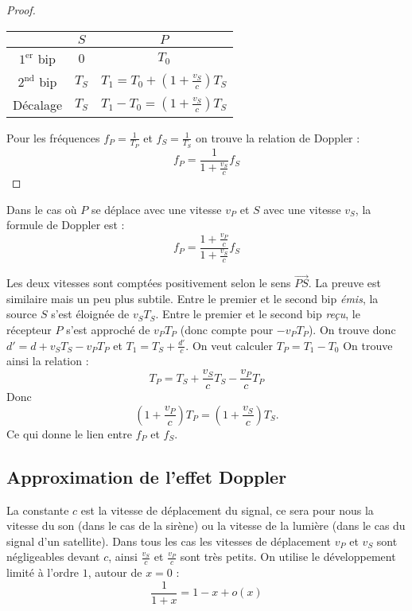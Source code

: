 \documentclass[class=report,crop=false]{standalone}
\newcommand{\vect}{\overrightarrow}
\begin{document}
\begin{proof}
\begin{center}
\setlength{\arrayrulewidth}{0.05mm}
\begin{tabular}[t]{ccc@{\vrule depth 2.5ex height 3.5ex width 0mm \ }} 
  \quad  \qquad         & \quad $S$ \quad     & \quad $P$ \quad          \\ \hline\hline
   $1^{\text{er}}$ bip  & $0$      & $T_0$         \\ \hline
   $2^{\text{nd}}$ bip  & $T_S$    & $T_1=T_0+\left(1+\frac{v_S}{c}\right)T_S$ \\ \hline
   Décalage             & $T_S$    & $T_1-T_0 = \left(1+\frac{v_S}{c}\right)T_S$  \\    
\end{tabular} 
\end{center}

Pour les fréquences $f_P = \frac{1}{T_P}$ et $f_S = \frac{1}{T_S}$ 
on trouve la relation de Doppler :
$$f_P = \frac{1}{ 1+\frac{v_S}{c}} f_S $$
\end{proof}


\begin{proposition}
Dans le cas où $P$ se déplace avec une vitesse $v_P$ et 
$S$ avec une vitesse $v_S$, la formule de Doppler est :
$$f_P = \frac{1+\frac{v_P}{c}}{1+\frac{v_S}{c}}f_S $$  
\end{proposition}



Les deux vitesses sont comptées positivement
selon le sens $\vect{PS}$.
La preuve est similaire mais un peu plus subtile. Entre le premier et le second bip \emph{émis}, la source $S$
s'est éloignée de $v_ST_S$. 
Entre le premier et le second bip \emph{reçu}, le récepteur $P$ s'est approché
de $v_PT_P$ (donc compte pour $-v_PT_P$).
On trouve donc $d' = d + v_ST_S - v_PT_P$ et
$T_1 = T_S + \frac{d'}{c}$. 
On veut calculer $T_P = T_1-T_0$
On trouve ainsi la relation :
$$T_P = T_S  + \frac{v_S}{c} T_S - \frac{v_P}{c} T_P$$
Donc 
$$\left(1+\frac{v_P}{c}\right) T_P = \left(1+\frac{v_S}{c}\right) T_S .$$
Ce qui donne le lien entre $f_P$ et $f_S$.


\subsection{Approximation de l'effet Doppler}

La constante $c$ est la vitesse de déplacement du signal, ce sera 
pour nous la vitesse du son (dans le cas de la sirène) ou la vitesse de la lumière
(dans le cas du signal d'un satellite).
Dans tous les cas les vitesses de déplacement $v_P$ et $v_S$ sont négligeables devant $c$,
ainsi $\frac{v_S}{c}$ et $\frac{v_P}{c}$ sont très petits.
On utilise le développement limité à l'ordre $1$, autour de $x=0$ :
$$\frac{1}{1+x} = 1 - x + o(x)$$
\end{document}
